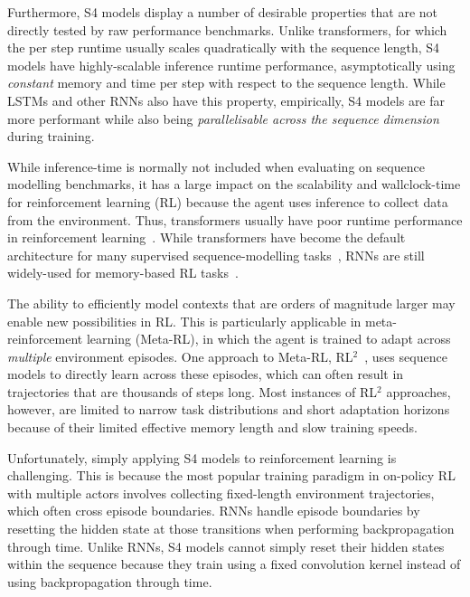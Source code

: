\documentclass{article}
\begin{document}
Furthermore, S4 models display a number of desirable properties that are not directly tested by raw performance benchmarks. Unlike transformers, for which the per step runtime usually scales quadratically with the sequence length, S4 models have highly-scalable inference runtime performance, asymptotically using \textit{constant} memory and time per step with respect to the sequence length. While LSTMs and other RNNs also have this property, empirically, S4 models are far more performant while also being \textit{parallelisable across the sequence dimension} during training. 

While inference-time is normally not included when evaluating on sequence modelling benchmarks, 
it has a large impact on the scalability and wallclock-time for reinforcement learning (RL) because the agent uses inference to collect data from the environment. Thus, transformers usually have poor runtime performance in reinforcement learning~\citep{parisotto2021efficient}. While transformers have become the default architecture for many supervised sequence-modelling tasks~\citep{vaswani2017attention}, RNNs are still widely-used for memory-based RL tasks~\citep{ni2022recurrent}. 

The ability to efficiently model contexts that are orders of magnitude larger may enable new possibilities in RL. This is particularly applicable in meta-reinforcement learning (Meta-RL), in which the agent is trained to adapt across \textit{multiple} environment episodes. One approach to Meta-RL, RL$^2$~\citep{duan2016rl, wang2016learning}, uses sequence models to directly learn across these episodes, which can often result in trajectories that are thousands of steps long. Most instances of RL$^2$ approaches, however, are limited to narrow task distributions and short adaptation horizons because of their limited effective memory length and slow training speeds. 

Unfortunately, simply applying S4 models to reinforcement learning is challenging. This is because the most popular training paradigm in on-policy RL with multiple actors involves collecting fixed-length environment trajectories, which often cross episode boundaries. RNNs handle episode boundaries by resetting the hidden state at those transitions when performing backpropagation through time. Unlike RNNs, S4 models cannot simply reset their hidden states within the sequence because they train using a fixed convolution kernel instead of using backpropagation through time. 
\end{document}
